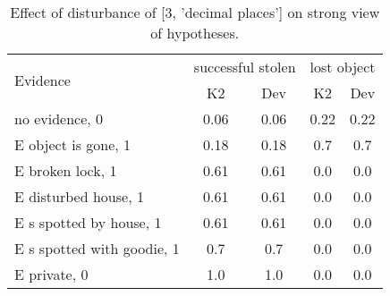 \begin{table}\begin{tabular}{l|cc|cc}\toprule\multirow{2}{*}{Evidence} & \multicolumn{2}{c}{successful stolen}& \multicolumn{2}{c}{lost object}\\& {K2} & {Dev}& {K2} & {Dev}\\\midrule
no evidence, 0 & 0.06&0.06&0.22&0.22\\E object is gone, 1 & 0.18&0.18&0.7&0.7\\E broken lock, 1 & 0.61&0.61&0.0&0.0\\E disturbed house, 1 & 0.61&0.61&0.0&0.0\\E s spotted by house, 1 & 0.61&0.61&0.0&0.0\\E s spotted with goodie, 1 & 0.7&0.7&0.0&0.0\\E private, 0 & 1.0&1.0&0.0&0.0\\\bottomrule\end{tabular}\caption{Effect of disturbance of [3, 'decimal places'] on strong view of hypotheses.}\end{table}